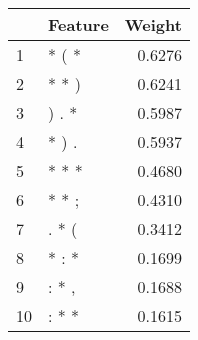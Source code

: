 \begin{tabular}{llr}
\toprule
{} & Feature &  Weight \\
\midrule
1  &   * ( * &  0.6276 \\
2  &   * * ) &  0.6241 \\
3  &   ) . * &  0.5987 \\
4  &   * ) . &  0.5937 \\
5  &   * * * &  0.4680 \\
6  &   * * ; &  0.4310 \\
7  &   . * ( &  0.3412 \\
8  &   * : * &  0.1699 \\
9  &   : * , &  0.1688 \\
10 &   : * * &  0.1615 \\
\bottomrule
\end{tabular}
